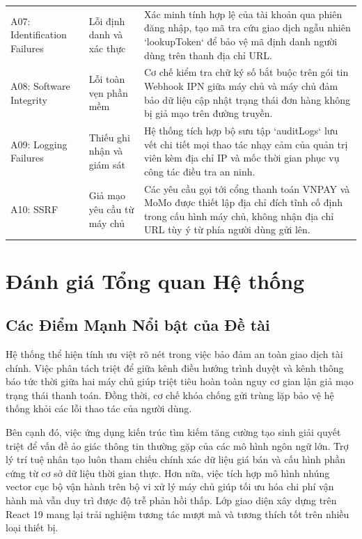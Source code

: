 \begin{table}[H]
\begin{tabularx}{\textwidth}{p{3.5cm}p{4cm}X}
\addlinespace
A07: Identification Failures & Lỗi định danh và xác thực & Xác minh tính hợp lệ của tài khoản qua phiên đăng nhập, tạo mã tra cứu giao dịch ngẫu nhiên `lookupToken` để bảo vệ mã định danh người dùng trên thanh địa chỉ URL. \\
\addlinespace
A08: Software Integrity & Lỗi toàn vẹn phần mềm & Cơ chế kiểm tra chữ ký số bắt buộc trên gói tin Webhook IPN giữa máy chủ và máy chủ đảm bảo dữ liệu cập nhật trạng thái đơn hàng không bị giả mạo trên đường truyền. \\
\addlinespace
A09: Logging Failures & Thiếu ghi nhận và giám sát & Hệ thống tích hợp bộ sưu tập `auditLogs` lưu vết chi tiết mọi thao tác nhạy cảm của quản trị viên kèm địa chỉ IP và mốc thời gian phục vụ công tác điều tra an ninh. \\
\addlinespace
A10: SSRF & Giả mạo yêu cầu từ máy chủ & Các yêu cầu gọi tới cổng thanh toán VNPAY và MoMo được thiết lập địa chỉ đích tĩnh cố định trong cấu hình máy chủ, không nhận địa chỉ URL tùy ý từ phía người dùng gửi lên. \\
\bottomrule
\end{tabularx}
\end{table}

\section{Đánh giá Tổng quan Hệ thống}
\subsection{Các Điểm Mạnh Nổi bật của Đề tài}
Hệ thống thể hiện tính ưu việt rõ nét trong việc bảo đảm an toàn giao dịch tài chính. Việc phân tách triệt để giữa kênh điều hướng trình duyệt và kênh thông báo tức thời giữa hai máy chủ giúp triệt tiêu hoàn toàn nguy cơ gian lận giả mạo trạng thái thanh toán. Đồng thời, cơ chế khóa chống gửi trùng lặp bảo vệ hệ thống khỏi các lỗi thao tác của người dùng.

Bên cạnh đó, việc ứng dụng kiến trúc tìm kiếm tăng cường tạo sinh giải quyết triệt để vấn đề ảo giác thông tin thường gặp của các mô hình ngôn ngữ lớn. Trợ lý trí tuệ nhân tạo luôn tham chiếu chính xác dữ liệu giá bán và cấu hình phần cứng từ cơ sở dữ liệu thời gian thực. Hơn nữa, việc tích hợp mô hình nhúng vector cục bộ vận hành trên bộ vi xử lý máy chủ giúp tối ưu hóa chi phí vận hành mà vẫn duy trì được độ trễ phản hồi thấp. Lớp giao diện xây dựng trên React 19 mang lại trải nghiệm tương tác mượt mà và tương thích tốt trên nhiều loại thiết bị.

